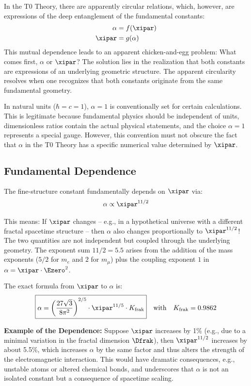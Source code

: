 	In the T0 Theory, there are apparently circular relations, which, however, are expressions of the deep entanglement of the fundamental constants:
	\begin{align*}
		\alpha &= f(\xipar) \\
		\xipar &= g(\alpha)
	\end{align*}
	This mutual dependence leads to an apparent chicken-and-egg problem: What comes first, $\alpha$ or $\xipar$? The solution lies in the realization that both constants are expressions of an underlying geometric structure. The apparent circularity resolves when one recognizes that both constants originate from the same fundamental geometry.
	
	In natural units ($\hbar = c = 1$), $\alpha = 1$ is conventionally set for certain calculations. This is legitimate because fundamental physics should be independent of units, dimensionless ratios contain the actual physical statements, and the choice $\alpha = 1$ represents a special gauge. However, this convention must not obscure the fact that $\alpha$ in the T0 Theory has a specific numerical value determined by $\xipar$.
	
	\subsection{Fundamental Dependence}
	
	The fine-structure constant fundamentally depends on $\xipar$ via:
	\begin{equation}
		\alpha \propto \xipar^{11/2}
		\label{eq:alpha_xi_dependence}
	\end{equation}
	
	This means: If $\xipar$ changes – e.g., in a hypothetical universe with a different fractal spacetime structure – then $\alpha$ also changes proportionally to $\xipar^{11/2}$! The two quantities are not independent but coupled through the underlying geometry. The exponent sum $11/2 = 5.5$ arises from the addition of the mass exponents ($5/2$ for $m_e$ and $2$ for $m_\mu$) plus the coupling exponent $1$ in $\alpha = \xipar \cdot \Ezero^2$.
	
	The exact formula from $\xipar$ to $\alpha$ is:
	\begin{equation}
		\boxed{\alpha = \left(\frac{27\sqrt{3}}{8\pi^2}\right)^{2/5} \cdot \xipar^{11/5} \cdot K_{\text{frak}}}
		\quad \text{with} \quad K_{\text{frak}} = 0.9862
	\end{equation}
	
	\textbf{Example of the Dependence:} Suppose $\xipar$ increases by 1\% (e.g., due to a minimal variation in the fractal dimension $\Dfrak$), then $\xipar^{11/2}$ increases by about 5.5\%, which increases $\alpha$ by the same factor and thus alters the strength of the electromagnetic interaction. This would have dramatic consequences, e.g., unstable atoms or altered chemical bonds, and underscores that $\alpha$ is not an isolated constant but a consequence of spacetime scaling.
	
